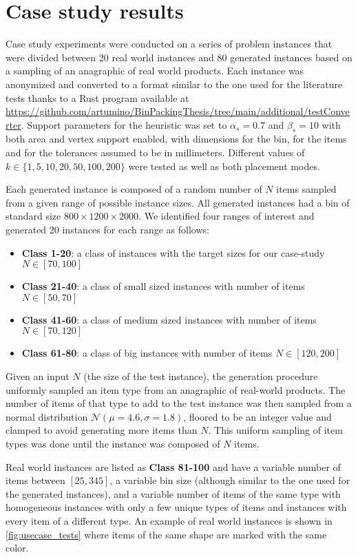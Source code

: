 \section{Case study results}
Case study experiments were conducted on a series of problem instances that were divided between 20 real world instances and 80 generated instances based on a sampling of an anagraphic of real world products.
Each instance was anonymized and converted to a format similar to the one used for the literature tests thanks to a Rust program available at \url{https://github.com/artumino/BinPackingThesis/tree/main/additional/testConverter}.
Support parameters for the heuristic was set to $\alpha_s = 0.7$ and $\beta_s = 10$ with both area and vertex support enabled, with dimensions for the bin, for the items and for the tolerances assumed to be in millimeters.
Different values of $k \in \{1, 5, 10, 20, 50, 100, 200\}$ were tested as well as both placement modes.

Each generated instance is composed of a random number of $N$ items sampled from a given range of possible instance sizes. All generated instances had a bin of standard size $800 \times 1200 \times 2000$.
We identified four ranges of interest and generated 20 instances for each range as follows:
\begin{itemize}
    \item \textbf{Class 1-20}: a class of instances with the target sizes for our case-study $N \in [70,100]$
    \item \textbf{Class 21-40}: a class of small sized instances with number of items $N \in [50,70]$
    \item \textbf{Class 41-60}: a class of medium sized instances with number of items $N \in [70,120]$
    \item \textbf{Class 61-80}: a class of big instances with number of items $N \in [120,200]$
\end{itemize}

Given an input $N$ (the size of the test instance), the generation procedure uniformly sampled an item type from an anagraphic of real-world products. The number of items of that type to add to the test instance was then sampled from a normal distribution $\mathcal{N}(\mu = 4.6, \sigma = 1.8)$, floored to be an integer value and clamped to avoid generating more items than $N$. 
This uniform sampling of item types was done until the instance was composed of $N$ items.

Real world instances are listed as \textbf{Class 81-100} and have a variable number of items between $[25, 345]$, a variable bin size (although similar to the one used for the generated instances), and a variable number of items of the same type with homogeneous instances with only a few unique types of items and instances with every item of a different type.
An example of real world instances is shown in \cref{fig:usecase_tests} where items of the same shape are marked with the same color.

